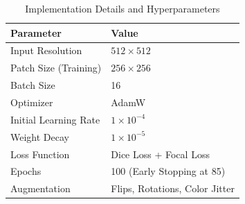 \begin{table}[htbp]
\caption{Implementation Details and Hyperparameters}
\begin{center}
\begin{tabular}{|l|l|}
\hline
\textbf{Parameter} & \textbf{Value} \\
\hline
Input Resolution & $512 \times 512$ \\
Patch Size (Training) & $256 \times 256$ \\
Batch Size & 16 \\
Optimizer & AdamW \\
Initial Learning Rate & $1 \times 10^{-4}$ \\
Weight Decay & $1 \times 10^{-5}$ \\
Loss Function & Dice Loss + Focal Loss \\
Epochs & 100 (Early Stopping at 85) \\
Augmentation & Flips, Rotations, Color Jitter \\
\hline
\end{tabular}
\label{tab:hyperparams}
\end{center}
\end{table}
